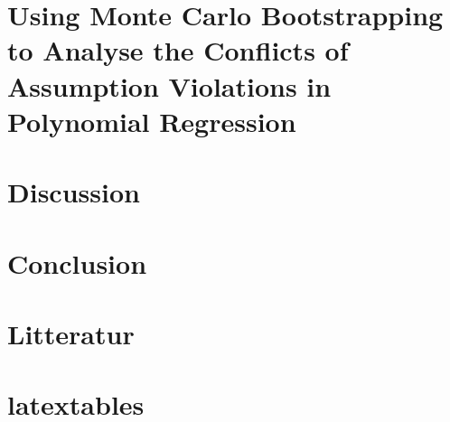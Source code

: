 \documentclass{article}
\begin{document}
	
	\section{Using Monte Carlo Bootstrapping to Analyse the Conflicts of Assumption Violations in Polynomial Regression}
	
	\newpage
	
	\section{Discussion}
	
	\newpage
	
	\section{Conclusion}
	
	\newpage
	
 	\section{Litteratur}
 	
 	\section{latextables}
 	\newpage
 	
 	
 	
\end{document}
